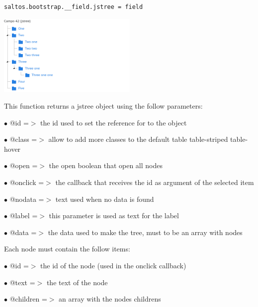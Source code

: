 \documentclass[a4paper]{article}
\begin{document}
\begin{lstlisting}
saltos.bootstrap.__field.jstree = field
\end{lstlisting}

\begin{center}\includegraphics[width=0.5\textwidth]{../ujest/snaps/test-bootstrap-js-bootstrap-campo-42-jstree-1-snap.png}\end{center}

This function returns a jstree object using the follow parameters:

\begin{compactitem}
\item[\color{myblue}$\bullet$] @id      =$>$ the id used to set the reference for to the object
\item[\color{myblue}$\bullet$] @class    =$>$ allow to add more classes to the default table table-striped table-hover
\item[\color{myblue}$\bullet$] @open    =$>$ the open boolean that open all nodes
\item[\color{myblue}$\bullet$] @onclick =$>$ the callback that receives the id as argument of the selected item
\item[\color{myblue}$\bullet$] @nodata   =$>$ text used when no data is found
\item[\color{myblue}$\bullet$] @label    =$>$ this parameter is used as text for the label
\item[\color{myblue}$\bullet$] @data    =$>$ the data used to make the tree, must to be an array with nodes
\end{compactitem}

Each node must contain the follow items:

\begin{compactitem}
\item[\color{myblue}$\bullet$] @id       =$>$ the id of the node (used in the onclick callback)
\item[\color{myblue}$\bullet$] @text     =$>$ the text of the node
\item[\color{myblue}$\bullet$] @children =$>$ an array with the nodes childrens
\end{compactitem}
\end{document}
